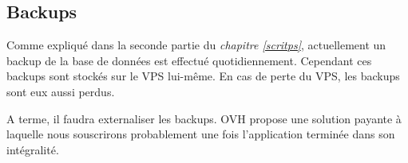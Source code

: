 \newpage

\subsection{Backups}

Comme expliqué dans la seconde partie du \textit{chapitre \ref{scritps}}, actuellement un backup de la base de données est effectué quotidiennement. Cependant ces backups sont stockés sur le VPS lui-même. En cas de perte du VPS, les backups sont eux aussi perdus.

\newpara

A terme, il faudra externaliser les backups. OVH propose une solution payante à laquelle nous souscrirons probablement une fois l'application terminée dans son intégralité.